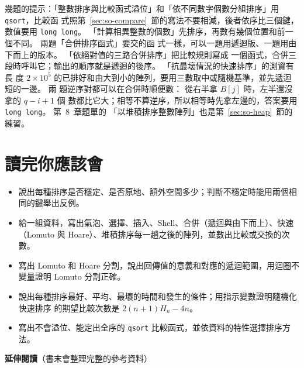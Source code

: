 幾題的提示：「整數排序與比較函式溢位」和「依不同數字個數分組排序」用 \texttt{qsort}，比較函
式照第~\ref{sec:so-compare}~節的寫法不要相減，後者依序比三個鍵，數值要用 \texttt{long long}。
「計算相異整數的個數」先排序，再數有幾個位置和前一個不同。 兩題「合併排序函式」要交的函
式一樣，可以一題用遞迴版、一題用由下而上的版本。 「依絕對值的三路合併排序」把比較規則寫成
一個函式，合併三段時呼叫它；輸出的順序就是遞迴的後序。 「抗最壞情況的快速排序」的測資有長
度 $2 \times 10^5$ 的已排好和由大到小的陣列，要用三數取中或隨機基準，並先遞迴短的一邊。 兩
題逆序對都可以在合併時順便數： 從右半拿 $B[j]$ 時，左半還沒拿的 $q - i + 1$ 個
數都比它大；相等不算逆序，所以相等時先拿左邊的，答案要用 \texttt{long long}。 第~8~章題單的
「以堆積排序整數陣列」也是第~\ref{sec:so-heap}~節的練習。

\section{讀完你應該會}
\label{sec:so-checklist}

\begin{itemize}
\item 說出每種排序是否穩定、是否原地、額外空間多少；判斷不穩定時能用兩個相同的鍵舉出反例。
\item 給一組資料，寫出氣泡、選擇、插入、Shell、合併（遞迴與由下而上）、快速（Lomuto 與
Hoare）、堆積排序每一趟之後的陣列，並數出比較或交換的次數。
\item 寫出 Lomuto 和 Hoare 分割，說出回傳值的意義和對應的遞迴範圍，用迴圈不變量證明
Lomuto 分割正確。
\item 說出每種排序最好、平均、最壞的時間和發生的條件；用指示變數證明隨機化快速排序
的期望比較次數是 $2(n+1)H_n - 4n$。
\item 寫出不會溢位、能定出全序的 \texttt{qsort} 比較函式，並依資料的特性選擇排序方法。
\end{itemize}

\textbf{延伸閱讀}（書末會整理完整的參考資料）

